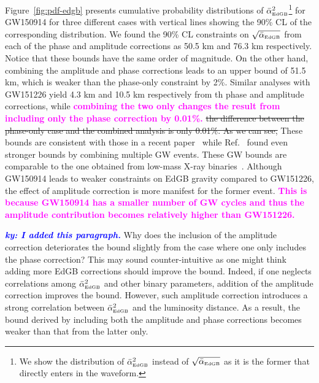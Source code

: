 \documentclass[prd,twocolumn,nofootinbib]{revtex4-1}
\newcommand{\EDGB}{{\mbox{\tiny EdGB}}}
\newcommand{\ky}[1]{\textcolor{blue}{\it{\textbf{ky: #1}}} }
\newcommand{\kent}[1]{\textcolor{magenta}{\textbf{#1}} }
\begin{document}
Figure~\ref{fig:pdf-edgb} presents cumulative probability distributions of $\bar{\alpha}^2_{\EDGB}$\footnote{We show the distribution of $\bar{\alpha}^2_{\EDGB}$ instead of $\sqrt{\bar{\alpha}_{\EDGB}}$ as it is the former that directly enters in the waveform.} for GW150914 for three different cases with vertical lines showing the 90\% CL of the corresponding distribution. We found the 90\% CL constraints on  $\sqrt{\bar{\alpha}_{\EDGB}}$ from each of the phase and amplitude corrections as 50.5 km and 76.3 km respectively. Notice that these bounds have the same order of magnitude. On the other hand, combining the amplitude and phase corrections leads to an upper bound of 51.5 km, which is weaker than the  phase-only constraint by 2\%.
Similar analyses with GW151226 yield 4.3 km and 10.5 km respectively from th phase and amplitude corrections,
while \kent{combining the two only changes the result from including only the phase correction by 0.01\%.} \sout{the difference between the phase-only case and the combined analysis  is only 0.01\%. As we can see,} 
These bounds are consistent with those in a recent paper~\cite{Nair:2019iur} while Ref.~\cite{Yamada:2019zrb} found even stronger bounds by combining multiple GW events. These GW bounds are comparable to the one obtained from low-mass X-ray binaries~\cite{Yagi:2012gp}.
Although GW150914 leads to weaker constraints on EdGB gravity compared to GW151226, the effect of amplitude correction is more manifest for the former event. \kent{This is because GW150914 has a smaller number of GW cycles and thus the amplitude contribution becomes relatively higher than GW151226.}

\ky{I added this paragraph.}
Why does the inclusion of the amplitude correction deteriorates the bound slightly from the case where one only includes the phase correction? This may sound counter-intuitive as one might think adding more EdGB corrections should improve the bound. Indeed, if one neglects correlations among $\bar \alpha^2_\EDGB$ and other binary parameters, addition of the amplitude correction improves the bound. However, such amplitude correction introduces a strong correlation between $\bar \alpha^2_\EDGB$ and the luminosity distance. As a result, the bound derived by including both the amplitude and phase corrections becomes weaker than that from the latter only.
\end{document}
